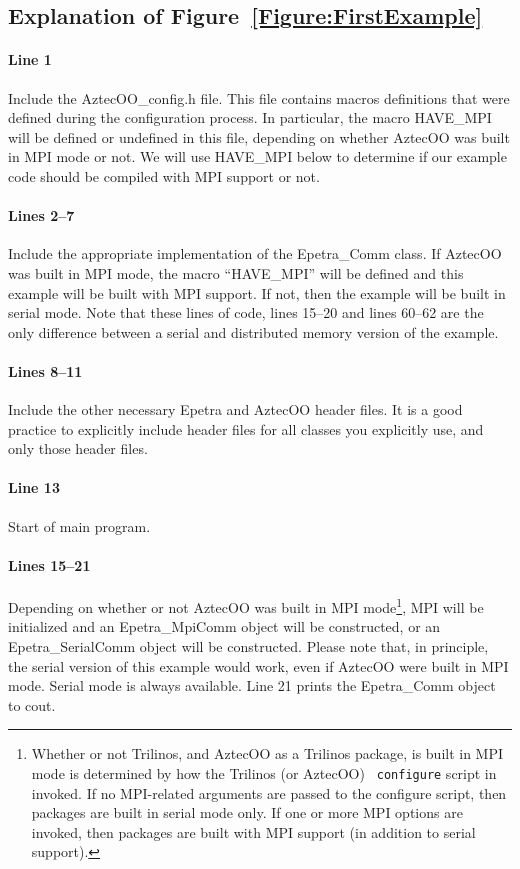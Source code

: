 \documentclass[12pt,relax]{AztecOOUserGuide}
\newcommand{\comm}{Epetra\_Comm}
\newcommand{\serialcomm}{Epetra\_SerialComm}
\newcommand{\mpicomm}{Epetra\_MpiComm}
\begin{document}
\subsection{Explanation of Figure~\ref{Figure:FirstExample}}

\paragraph{Line 1}
Include the AztecOO\_config.h file.  This file contains macros
definitions that were defined during the configuration process.  In
particular, the macro HAVE\_MPI will be defined or undefined in this
file, depending on whether AztecOO was built in MPI mode or not.  We
will use HAVE\_MPI below to determine if our example code should be
compiled with MPI support or not.
\paragraph{Lines 2--7}
Include the appropriate implementation of the \comm{} class.  If
AztecOO was built in MPI mode, the macro ``HAVE\_MPI'' will be defined
and this example will be built with MPI support.  If not, then the
example will be built in serial mode.  Note that these lines of code,
lines 15--20 and lines 60--62 are the only difference between a serial
and distributed memory version of the example. 
\paragraph{Lines 8--11}
Include the other necessary Epetra and AztecOO header files.
It is a good practice to explicitly include header files for all
classes you explicitly use, and only those header files.
\paragraph{Line 13}
Start of main program.
\paragraph{Lines 15--21}
Depending on whether or not AztecOO was built in MPI
mode\footnote{Whether or not Trilinos, and AztecOO as a Trilinos package, is built
in MPI mode is determined by how the Trilinos (or AztecOO) {\tt
configure} script in invoked.  If no MPI-related arguments are passed
to the configure script, then packages are built in serial mode only.
If one or more MPI options are invoked, then packages are built with
MPI support (in addition to serial support).}, MPI will be initialized
and an \mpicomm{} object will be constructed, or an \serialcomm{}
object will be constructed.  Please note that, in principle, the serial
version of this example would work, even if AztecOO were built in MPI
mode.  Serial mode is always available.  Line 21 prints the \comm{} 
object to cout.
\end{document}
